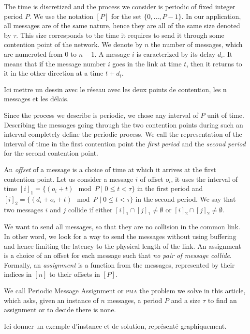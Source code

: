 \documentclass[10pt, conference, letterpaper]{IEEEtran}
\newcommand\pma{\textsc{pma}\xspace}
\begin{document}
The time is discretized and the process we consider is periodic of fixed integer period $P$. We use the notation $[P]$ for the set $\{0,\dots,P-1\}$. In our application, all messages are of the same nature, hence they are all of the same size denoted by $\tau$. This size corresponds to the time it requires to send it through some contention point of the network.
We denote by $n$ the number of messages, which are numeroted from $0$ to $n-1$. A message $i$ is caracterized by its delay $d_i$. It means that if the message number $i$ goes in the link at time $t$, then it returns to it in the other direction at a time $t + d_i$. 

Ici mettre un dessin avec le réseau avec les deux points de contention, les n messages et
les délais.

Since the process we describe is periodic, we chose any interval of $P$ unit of time.
Describing the messages going through the two contention points during such an interval
completely define the periodic process. We call the representation of the interval
of time in the first contention point the \emph{first period} and the \emph{second period}
for the second contention point.

An \emph{offset} of a message is a choice of time at which it arrives
at the first contention point. Let us consider a message $i$
of offset $o_i$, it uses the interval of time $[i]_1 = \{ (o_i + t) \mod P \mid 0 \leq t < \tau \}$ in the first period and $[i]_2 = \{ (d_i + o_i + t) \mod P \mid 0 \leq t < \tau \}$ in the second period. We say that two messages $i$ and $j$ collide if either $[i]_1 \cap [j]_1 \neq \emptyset $ or $[i]_2 \cap [j]_2 \neq \emptyset $.

We want to send all messages, so that they are no collision in the common link.
In other word, we look for a way to send the messages without using buffering and 
hence limiting the latency to the physical length of the link. An assignment is a
choice of an offset for each message such that \emph{no pair of message collide}.
Formally, an \emph{assignment} is a function from the messages, represented by their indices in $[n]$ to their offsets in $[P]$.  

We call Periodic Message Assignment or \pma the problem we solve in this article,
which asks, given an instance of $n$ messages, a period $P$ and a size $\tau$ to find 
an assignment or to decide there is none.

Ici donner un exemple d'instance et de solution, représenté graphiquement.
\end{document}

